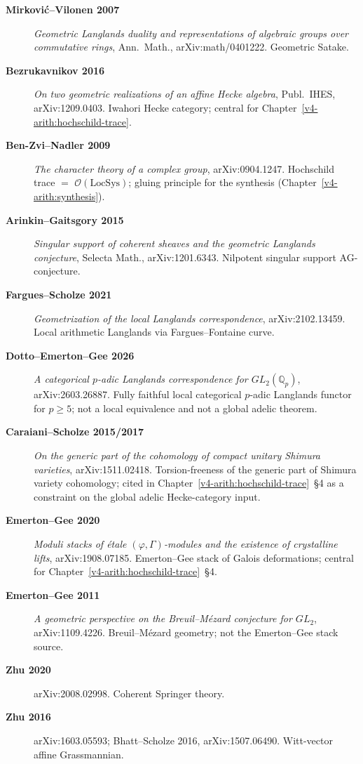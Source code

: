 \begin{description}
\item[\textbf{Mirkovi\'c--Vilonen 2007}] \emph{Geometric Langlands
duality and representations of algebraic groups over commutative
rings}, Ann.~Math., arXiv:math/0401222. Geometric Satake.
\item[\textbf{Bezrukavnikov 2016}] \emph{On two geometric
realizations of an affine Hecke algebra}, Publ.~IHES,
arXiv:1209.0403. Iwahori Hecke category; central for
Chapter~\ref{v4-arith:hochschild-trace}.
\item[\textbf{Ben-Zvi--Nadler 2009}] \emph{The character theory of
a complex group}, arXiv:0904.1247. Hochschild trace \(=\)
\(\mathcal{O}(\mathrm{LocSys})\); gluing principle for the synthesis
(Chapter~\ref{v4-arith:synthesis}).
\item[\textbf{Arinkin--Gaitsgory 2015}] \emph{Singular support of
coherent sheaves and the geometric Langlands conjecture}, Selecta
Math., arXiv:1201.6343. Nilpotent singular support AG-conjecture.
\item[\textbf{Fargues--Scholze 2021}] \emph{Geometrization of the
local Langlands correspondence}, arXiv:2102.13459. Local
arithmetic Langlands via Fargues--Fontaine curve.
\item[\textbf{Dotto--Emerton--Gee 2026}] \emph{A categorical
\(p\)-adic Langlands correspondence for \(GL_{2}(\mathbb{Q}_{p})\)},
arXiv:2603.26887. Fully faithful local categorical
\(p\)-adic Langlands functor for \(p\geq 5\); not a local equivalence
and not a global adelic theorem.
\item[\textbf{Caraiani--Scholze 2015/2017}] \emph{On the generic part of
the cohomology of compact unitary Shimura varieties},
arXiv:1511.02418. Torsion-freeness of the generic part of Shimura
variety cohomology; cited in
Chapter~\ref{v4-arith:hochschild-trace}~\S4 as a constraint on the
global adelic Hecke-category input.
\item[\textbf{Emerton--Gee 2020}] \emph{Moduli stacks of \'etale
\((\varphi,\Gamma)\)-modules and the existence of crystalline lifts},
arXiv:1908.07185. Emerton--Gee stack of Galois deformations; central for
Chapter~\ref{v4-arith:hochschild-trace}~\S4.
\item[\textbf{Emerton--Gee 2011}] \emph{A geometric perspective on
the Breuil--M\'ezard conjecture for \(GL_{2}\)}, arXiv:1109.4226.
Breuil--M\'ezard geometry; not the Emerton--Gee stack source.
\item[\textbf{Zhu 2020}] arXiv:2008.02998. Coherent Springer theory.
\item[\textbf{Zhu 2016}] arXiv:1603.05593; Bhatt--Scholze 2016,
arXiv:1507.06490. Witt-vector affine Grassmannian.
\end{description}

